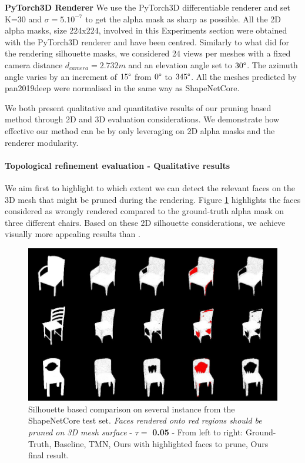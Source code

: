 \noindent\textbf{PyTorch3D Renderer} We use the PyTorch3D \citep{nie2020total3dunderstanding} differentiable renderer and set K=30 and $\sigma=5.10^{-7}$ to get the alpha mask as sharp as possible. All the 2D alpha masks, size 224x224, involved in this Experiments section were obtained with the PyTorch3D renderer and have been centred. Similarly to what \citep{choy20163d,liu2019soft,yan2016perspective} did for the rendering silhouette masks, we considered 24 views per meshes with a fixed camera distance $d_{camera}=2.732m$ and an elevation angle set to $30\degree$. The azimuth angle varies by an increment of $15\degree$ from $0\degree$ to $345\degree$. All the meshes predicted by pan2019deep \citep{pan2019deep} were normalised in the same way as ShapeNetCore\citep{chang2015shapenet}. 

We both present qualitative and quantitative results of our pruning based method through 2D and 3D evaluation considerations. We demonstrate how effective our method can be by only leveraging on 2D alpha masks and the renderer modularity. 

\paragraph{Topological refinement evaluation - Qualitative results}

We aim first to highlight to which extent we can detect the relevant faces on the 3D mesh that might be pruned during the rendering. Figure \ref{fig:face2prune} highlights the faces considered as wrongly rendered compared to the ground-truth alpha mask on three different chairs. Based on these 2D silhouette considerations, we achieve visually more appealing results than \citep{pan2019deep}. 

\begin{figure}[htp!]%
\begin{center}
\includegraphics[width=\linewidth]{images/adaptativesr/highlight_faces.png}
\end{center}
    \caption{Silhouette based comparison on several instance from the ShapeNetCore test set. \textit{Faces rendered onto red regions should be pruned on 3D mesh surface} - $\tau = $ \textbf{0.05} - From left to right: Ground-Truth, Baseline, TMN\citep{pan2019deep}, Ours with highlighted faces to prune, Ours final result.}
\label{fig:face2prune}
\end{figure}

